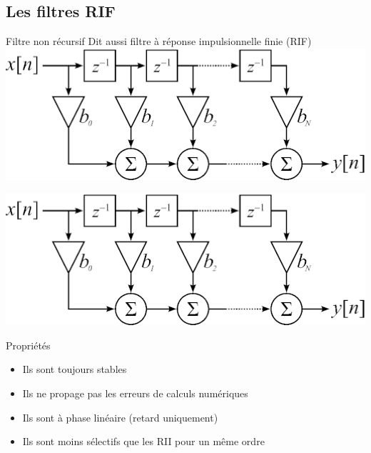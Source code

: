 \documentclass{beamer}
\begin{document}
\subsection{Les filtres RIF}
\begin{frame}
\begin{block}{Filtre non récursif}
\justify Dit aussi filtre à réponse impulsionnelle finie (RIF)
\center
\includegraphics[scale=.6]{images/FiltreRIF-2.eps}
\end{block}
\end{frame}

\begin{frame}
\center
\includegraphics[scale=.6]{images/FiltreRIF-2.eps}
\begin{block}{Propriétés}
\begin{itemize}
  \item Ils sont toujours stables
  \item Ils ne propage pas les erreurs de calculs numériques
  \item Ils sont à phase linéaire (retard uniquement)
  \item Ils sont moins sélectifs que les RII pour un même ordre
\end{itemize}
\end{block}
\end{frame}  
\end{document}
